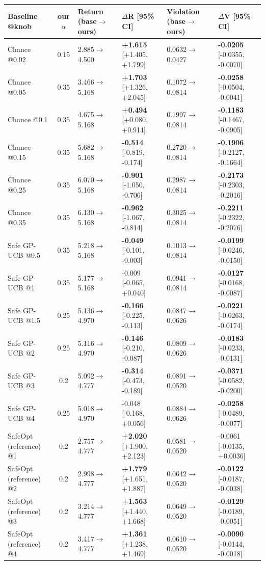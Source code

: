 \begin{tabular}{lcllll}
\toprule
Baseline @knob & our $\alpha$ & Return (base$\to$ours) & $\Delta$R [95\% CI] & Violation (base$\to$ours) & $\Delta$V [95\% CI] \\
\midrule
Chance @0.02 & 0.15 & 2.885$\to$4.500 & \textbf{+1.615} [+1.405, +1.799] & 0.0632$\to$0.0427 & \textbf{-0.0205} [-0.0355, -0.0070] \\
Chance @0.05 & 0.35 & 3.466$\to$5.168 & \textbf{+1.703} [+1.326, +2.045] & 0.1072$\to$0.0814 & \textbf{-0.0258} [-0.0504, -0.0041] \\
Chance @0.1 & 0.35 & 4.675$\to$5.168 & \textbf{+0.494} [+0.080, +0.914] & 0.1997$\to$0.0814 & \textbf{-0.1183} [-0.1467, -0.0905] \\
Chance @0.15 & 0.35 & 5.682$\to$5.168 & \textbf{-0.514} [-0.819, -0.174] & 0.2720$\to$0.0814 & \textbf{-0.1906} [-0.2127, -0.1664] \\
Chance @0.25 & 0.35 & 6.070$\to$5.168 & \textbf{-0.901} [-1.050, -0.706] & 0.2987$\to$0.0814 & \textbf{-0.2173} [-0.2303, -0.2016] \\
Chance @0.35 & 0.35 & 6.130$\to$5.168 & \textbf{-0.962} [-1.067, -0.814] & 0.3025$\to$0.0814 & \textbf{-0.2211} [-0.2322, -0.2076] \\
Safe GP-UCB @0.5 & 0.35 & 5.218$\to$5.168 & \textbf{-0.049} [-0.101, -0.003] & 0.1013$\to$0.0814 & \textbf{-0.0199} [-0.0246, -0.0150] \\
Safe GP-UCB @1 & 0.35 & 5.177$\to$5.168 & -0.009 [-0.065, +0.040] & 0.0941$\to$0.0814 & \textbf{-0.0127} [-0.0168, -0.0087] \\
Safe GP-UCB @1.5 & 0.25 & 5.136$\to$4.970 & \textbf{-0.166} [-0.225, -0.113] & 0.0847$\to$0.0626 & \textbf{-0.0221} [-0.0263, -0.0174] \\
Safe GP-UCB @2 & 0.25 & 5.116$\to$4.970 & \textbf{-0.146} [-0.210, -0.087] & 0.0809$\to$0.0626 & \textbf{-0.0183} [-0.0233, -0.0131] \\
Safe GP-UCB @3 & 0.2 & 5.092$\to$4.777 & \textbf{-0.314} [-0.473, -0.189] & 0.0891$\to$0.0520 & \textbf{-0.0371} [-0.0582, -0.0200] \\
Safe GP-UCB @4 & 0.25 & 5.018$\to$4.970 & -0.048 [-0.168, +0.056] & 0.0884$\to$0.0626 & \textbf{-0.0258} [-0.0489, -0.0077] \\
SafeOpt (reference) @1 & 0.2 & 2.757$\to$4.777 & \textbf{+2.020} [+1.900, +2.123] & 0.0581$\to$0.0520 & -0.0061 [-0.0135, +0.0036] \\
SafeOpt (reference) @2 & 0.2 & 2.998$\to$4.777 & \textbf{+1.779} [+1.651, +1.887] & 0.0642$\to$0.0520 & \textbf{-0.0122} [-0.0187, -0.0038] \\
SafeOpt (reference) @3 & 0.2 & 3.214$\to$4.777 & \textbf{+1.563} [+1.440, +1.668] & 0.0649$\to$0.0520 & \textbf{-0.0129} [-0.0189, -0.0051] \\
SafeOpt (reference) @4 & 0.2 & 3.417$\to$4.777 & \textbf{+1.361} [+1.238, +1.469] & 0.0610$\to$0.0520 & \textbf{-0.0090} [-0.0144, -0.0018] \\
\bottomrule
\end{tabular}
